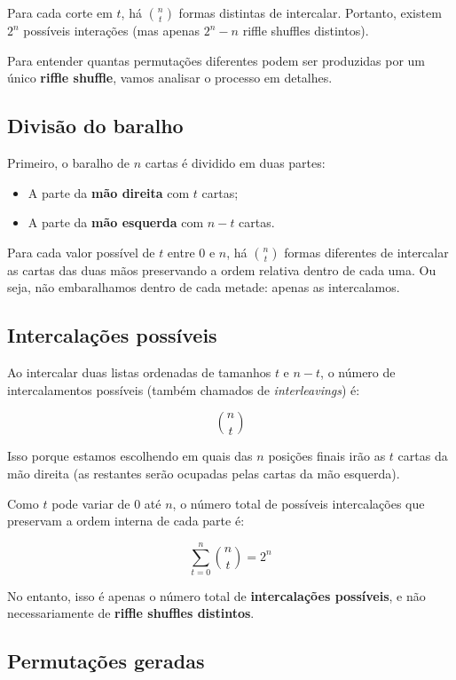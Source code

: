 \documentclass[12pt]{article}
\begin{document}
Para cada corte em $t$, há $\binom{n}{t}$ formas distintas de intercalar. Portanto, existem $2^n$ possíveis interações (mas apenas $2^n - n$ riffle shuffles distintos).

Para entender quantas permutações diferentes podem ser produzidas por um único \textbf{riffle shuffle}, vamos analisar o processo em detalhes.

\subsection*{Divisão do baralho}

Primeiro, o baralho de $n$ cartas é dividido em duas partes:
\begin{itemize}
    \item A parte da \textbf{mão direita} com $t$ cartas;
    \item A parte da \textbf{mão esquerda} com $n - t$ cartas.
\end{itemize}

Para cada valor possível de $t$ entre $0$ e $n$, há $\binom{n}{t}$ formas diferentes de intercalar as cartas das duas mãos preservando a ordem relativa dentro de cada uma. Ou seja, não embaralhamos dentro de cada metade: apenas as intercalamos.

\subsection*{Intercalações possíveis}

Ao intercalar duas listas ordenadas de tamanhos $t$ e $n - t$, o número de intercalamentos possíveis (também chamados de \textit{interleavings}) é:

\[
\binom{n}{t}
\]

Isso porque estamos escolhendo em quais das $n$ posições finais irão as $t$ cartas da mão direita (as restantes serão ocupadas pelas cartas da mão esquerda).

Como $t$ pode variar de $0$ até $n$, o número total de possíveis intercalações que preservam a ordem interna de cada parte é:

\[
\sum_{t=0}^{n} \binom{n}{t} = 2^n
\]

No entanto, isso é apenas o número total de \textbf{intercalações possíveis}, e não necessariamente de \textbf{riffle shuffles distintos}.

\subsection*{Permutações geradas}
\end{document}
